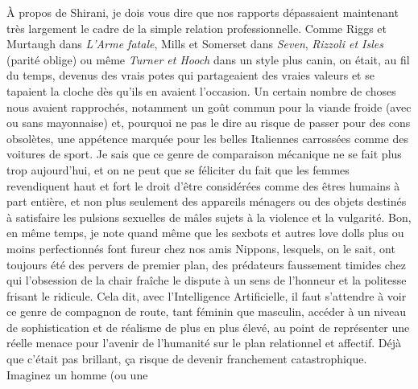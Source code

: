 À propos de Shirani, je dois vous dire que nos rapports dépassaient maintenant très largement le cadre de la simple relation professionnelle. Comme Riggs et Murtaugh dans \textit{L’Arme fatale}, Mills et Somerset dans \textit{Seven}, \textit{Rizzoli et Isles} (parité oblige) ou même \textit{Turner et Hooch} dans un style plus canin, on était, au fil du temps, devenus des vrais potes qui partageaient des vraies valeurs et se tapaient la cloche dès qu’ils en avaient l’occasion. \label{rat:16} Un certain nombre de choses nous avaient rapprochés, notamment un goût commun pour la viande froide (avec ou sans mayonnaise) et, pourquoi ne pas le dire au risque de passer pour des cons obsolètes, une appétence marquée pour les belles Italiennes carrossées comme des voitures de sport. Je sais que ce genre de comparaison mécanique ne se fait plus trop aujourd’hui, et on ne peut que se féliciter du fait que les femmes revendiquent haut et fort le droit d’être considérées comme des êtres humains à part entière, et non plus seulement des appareils ménagers ou des objets destinés à satisfaire les pulsions sexuelles de mâles sujets à la violence et la vulgarité. Bon, en même temps, je note quand même que les sexbots et autres love dolls plus ou moins perfectionnés font fureur chez nos amis Nippons, lesquels, on le sait, ont toujours été des pervers de premier plan, des prédateurs faussement timides chez qui l’obsession de la chair fraîche le dispute à un sens de l’honneur et la politesse frisant le ridicule. Cela dit, avec l’Intelligence Artificielle, il faut s’attendre à voir ce genre de compagnon de route, tant féminin que masculin, accéder à un niveau de sophistication et de réalisme de plus en plus élevé, au point de représenter une réelle menace pour l’avenir de l’humanité sur le plan relationnel et affectif. Déjà que c’était pas brillant, ça risque de devenir franchement catastrophique. Imaginez un homme (ou une 